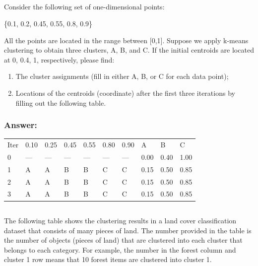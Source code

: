 \documentclass{article}
\begin{document}
\subsection{}

Consider the following set of one-dimensional points:
\begin{center}
    \{0.1, 0.2, 0.45, 0.55, 0.8, 0.9\}
\end{center}

All the points are located in the range between [0,1]. Suppose we apply k-means clustering to obtain three clusters, A, B, and C. If the initial centroids are located at {0, 0.4, 1}, respectively, please find:

\begin{enumerate}[label= (\alph*)]
    \item The cluster assignments (fill in either A, B, or C for each data point);
    \item Locations of the centroids (coordinate) after the first three iterations by filling out the following table.
\end{enumerate}

\subsubsection*{Answer:}

\begin{table}[ht]
    \centering
    \begin{tabular}{llllllllll}
    Iter & 0.10 & 0.25 & 0.45 & 0.55 & 0.80 & 0.90 & A & B & C \\
    0 & --- & --- & --- & --- & --- & --- & 0.00 & 0.40 & 1.00 \\
    1 & A  & A & B & B & C & C & 0.15 & 0.50 & 0.85 \\
    2 & A  & A & B & B & C & C & 0.15 & 0.50 & 0.85\\
    3 & A  & A & B & B & C & C & 0.15 & 0.50 & 0.85 
    \end{tabular}
\end{table}

\subsection{}
The following table shows the clustering results in a land cover classification dataset that consists of many pieces of land. The number provided in the table is the number of objects (pieces of land) that are clustered into each cluster that belongs to each category. For example, the number in the forest column and cluster 1 row means that 10 forest items are clustered into cluster 1.
\end{document}
